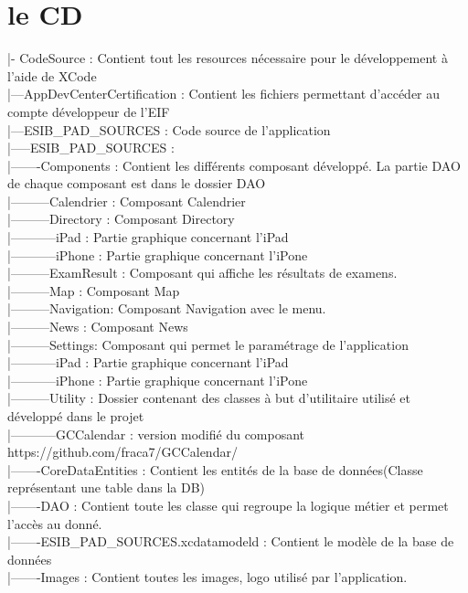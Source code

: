 \documentclass[12pt,a4paper,twoside]{report}
\begin{document}
\section{le CD}
 |- CodeSource : Contient tout les resources nécessaire pour le développement à l'aide de XCode\\
 |---AppDevCenterCertification : Contient les fichiers permettant d'accéder au compte développeur de l'EIF \\
 |---ESIB\_PAD\_SOURCES : Code source de l'application \\
 |-----ESIB\_PAD\_SOURCES : \\
 |-------Components : Contient les différents composant développé. La partie DAO de chaque composant est dans le dossier  DAO \\
 |---------Calendrier : Composant Calendrier\\
 |---------Directory : Composant Directory\\
 |-----------iPad : Partie graphique concernant l'iPad\\
 |-----------iPhone : Partie graphique concernant l'iPone \\
 |---------ExamResult : Composant qui affiche les résultats de examens.\\
 |---------Map : Composant Map\\
 |---------Navigation: Composant Navigation avec le menu.\\
 |---------News : Composant News \\
 |---------Settings: Composant qui permet le paramétrage de l'application\\
 |-----------iPad : Partie graphique concernant l'iPad\\
 |-----------iPhone : Partie graphique concernant l'iPone\\
 |---------Utility : Dossier contenant des classes à but d'utilitaire utilisé et développé dans le projet \\
 |-----------GCCalendar : version modifié du composant https://github.com/fraca7/GCCalendar/ \\
 |-------CoreDataEntities : Contient les entités de la base de données(Classe représentant une table dans la DB)\\
 |-------DAO : Contient toute les classe qui regroupe la logique métier et permet l'accès au donné.\\
 |-------ESIB\_PAD\_SOURCES.xcdatamodeld : Contient le modèle de la base de données \\
 |-------Images : Contient toutes les images, logo utilisé par l'application.\\
\end{document}
